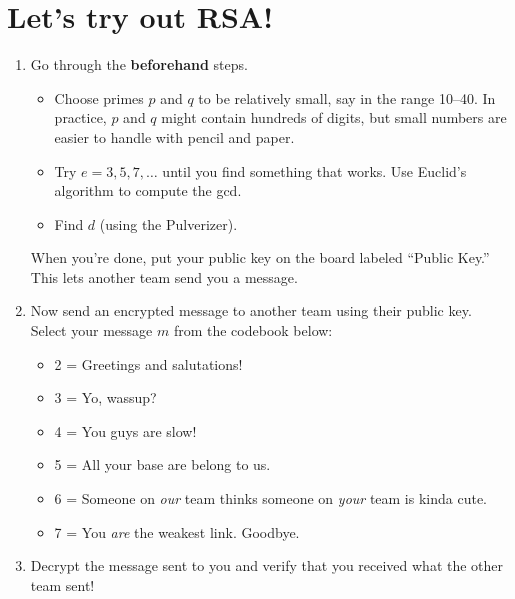 \documentclass[12pt]{article}
\begin{document}
\newpage
\section{Let's try out RSA!}
\begin{enumerate}[label=\textbf{(\alph*)}]

\item Go through the \textbf{beforehand} steps.

\begin{itemize}

\item Choose primes $p$ and $q$ to be relatively small, say in the
range 10--40.  In practice, $p$ and $q$ might contain hundreds of
digits, but small numbers are easier to handle with pencil and paper.

\item Try $e = 3, 5, 7, \dots$ until you find something that works.
Use Euclid's algorithm to compute the gcd.

\item Find $d$ (using the Pulverizer).

\end{itemize}

When you're done, put your public key on the board labeled ``Public Key.''  This lets another team send you a message.

\item Now send an encrypted message to another team using their
public key.  Select your message $m$ from the codebook below:

\begin{itemize}

\item 2 = Greetings and salutations!

\item 3 = Yo, wassup?

\item 4 = You guys are slow!

\item 5 = All your base are belong to us.

\item 6 = Someone on \emph{our} team thinks someone on \emph{your} team
is kinda cute.

\item 7 = You \emph{are} the weakest link.  Goodbye.

\end{itemize}

\item Decrypt the message sent to you and verify that you received
what the other team sent!

\end{enumerate}
\end{document}
